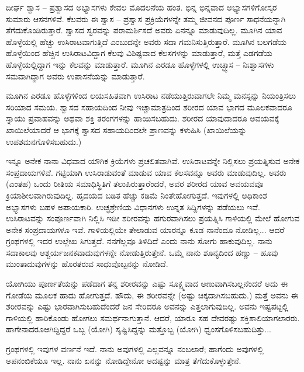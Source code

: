 \vskip 1.5pt

ದೀರ್ಘ ಶ್ವಾಸ – ಪ್ರಶ್ವಾಸದ ಅಭ್ಯಾಸಗಳು ಕೇವಲ ಮೊದಲನೆಯ ಹಂತ. ಭಿನ್ನ ಭಿನ್ನವಾದ ಅಭ್ಯಾಸಗಳಿಗೋಸ್ಕರ ಸುಮಾರು  ಆಸನಗಳಿವೆ. ಕೆಲವರು ಈ ಶ್ವಾಸ – ಪ್ರಶ್ವಾಸ ಪ್ರಕ್ರಿಯೆಗಳನ್ನೇ ತಮ್ಮ ಜೀವನದ ಪೂರ್ಣ ಸಾಧನೆಯನ್ನಾಗಿ ತೆಗೆದುಕೊಂಡಿರುತ್ತಾರೆ. ಶ್ವಾಸದ ಸ್ವರವನ್ನು ಪರಾಮರ್ಶಿಸದೆ ಅವರು ಏನನ್ನೂ ಮಾಡುವುದಿಲ್ಲ. ಮೂಗಿನ ಯಾವ ಹೊಳ್ಳೆಯಲ್ಲಿ ಹೆಚ್ಚು ಉಸಿರಾಟವಾಗುತ್ತಿದೆ ಎಂಬುದನ್ನೇ ಅವರು ಸದಾ ಗಮನಿಸುತ್ತಿರುತ್ತಾರೆ. ಮೂಗಿನ ಬಲಗಡೆಯ ಹೊಳ್ಳೆಯಿಂದ ಹೆಚ್ಚಿನ ಉಸಿರಾಟವಿದ್ದಾಗ ಕೆಲವು ವಿಶಿಷ್ಟವಾದ ಕೆಲಸಗಳನ್ನು ಮಾಡುತ್ತಾರೆ, ಮತ್ತೆ ಎಡಗಡೆಯ ಹೊಳ್ಳೆಯಲ್ಲಿದ್ದಾಗ ಇನ್ನು ಕೆಲವನ್ನು ಮಾಡುತ್ತಾರೆ. ಮೂಗಿನ ಎರಡೂ ಹೊಳ್ಳೆಗಳಲ್ಲಿ ಉಚ್ಛ್ವಾಸ – ನಿಃಶ್ವಾಸಗಳು ಸಮವಾಗಿದ್ದಾಗ ಅವರು ಉಪಾಸನೆಯನ್ನು ಮಾಡುತ್ತಾರೆ.

\vskip 1.5pt

ಮೂಗಿನ ಎರಡೂ ಹೊಳ್ಳೆಗಳಿಂದ ಲಯಸಹಿತವಾಗಿ ಉಸಿರಾಟ ನಡೆಯುತ್ತಿರುವಾಗಲೇ ನಿಮ್ಮ ಮನಸ್ಸನ್ನು ನಿಯಂತ್ರಿಸಲು ಸರಿಯಾದ ಸಮಯ. ಶ್ವಾಸದ ಸಹಾಯದಿಂದ ನೀವು ಇಚ್ಚಾಮಾತ್ರದಿಂದ ಶರೀರದ ಯಾವ ಭಾಗದ ಮೂಲಕವಾದರೂ ಸ್ನಾಯು ಪ್ರವಾಹವನ್ನು ಅಥವಾ ಶಕ್ತಿ ತರಂಗಗಳನ್ನು ಹಾಯಿಸಬಹುದು. ಶರೀರದ ಯಾವುದಾದರೂ ಅವಯವಕ್ಕೆ ಖಾಯಿಲೆಯಾದರೆ ಆ ಭಾಗಕ್ಕೆ ಶ್ವಾಸದ ಸಹಾಯದಿಂದಲೇ ಪ್ರಾಣವನ್ನು ಕಳುಹಿಸಿ (ಖಾಯಿಲೆಯನ್ನು ಉಪಶಮನಗೊಳಿಸಬಹುದು.)

\vskip 1.5pt

ಇನ್ನೂ ಅನೇಕ ನಾನಾ ವಿಧವಾದ ಯೌಗಿಕ ಕ್ರಿಯೆಗಳು ಪ್ರಚಲಿತವಾಗಿವೆ. ಉಸಿರಾಟವನ್ನೇ ನಿಲ್ಲಿಸಲು ಪ್ರಯತ್ನಿಸುವ ಅನೇಕ ಸಂಪ್ರದಾಯಗಳಿವೆ. ಗಟ್ಟಿಯಾಗಿ ಉಸಿರಾಡುವಂತೆ ಮಾಡುವ ಯಾವ ಕೆಲಸವನ್ನೂ ಅವರು ಮಾಡುವುದಿಲ್ಲ. ಅವರು (ಎಂತಹ) ಒಂದು ರೀತಿಯ ಸಮಾಧಿಸ್ಥಿತಿಗೆ ತಲುಪಿರುತ್ತಾರೆಂದರೆ, ಅವರ ಶರೀರದ ಯಾವ ಅವಯವವೂ ಕ್ರಿಯಾಶೀಲವಾಗಿರುವುದಿಲ್ಲ. ಹೃದಯದ ಬಡಿತ ಹೆಚ್ಚು ಕಡಿಮೆ ನಿಂತೇಹೋಗುತ್ತದೆ. ಇವುಗಳಲ್ಲಿ ಅಧಿಕಾಂಶ ಅಭ್ಯಾಸಗಳು ಬಹಳ ಅಪಾಯಕಾರಿ. ಉಚ್ಛಶ್ರೇಣಿಯ ವಿಧಾನಗಳು ಉನ್ನತ ಸಿದ್ದಿಗಳನ್ನು ಪಡೆಯಲು ಇವೆ. ಉಸಿರಾಟವನ್ನು ಸಂಪೂರ್ಣವಾಗಿ ನಿಲ್ಲಿಸಿ ಇಡೀ ಶರೀರವನ್ನು ಹಗುರವಾಗಿಸಲು ಪ್ರಯತ್ನಿಸಿ ಗಾಳಿಯಲ್ಲಿ ಮೇಲೆ ಹೋಗುವ ಅನೇಕ ಸಂಪ್ರದಾಯಗಳೂ ಇವೆ. ಗಾಳಿಯಲ್ಲಿಯೇ ತೇಲಾಡುವ ಯಾರನ್ನೂ ಕೂಡ ನಾನೆಂದೂ ನೋಡಿಲ್ಲ... ಆದರೆ ಗ್ರಂಥಗಳಲ್ಲಿ ಇದರ ಉಲ್ಲೇಖ ಸಿಗುತ್ತದೆ. ನನಗೆಲ್ಲವೂ ತಿಳಿದಿದೆ ಎಂದು ನಾನು ಸೋಗು ಹಾಕುವುದಿಲ್ಲ. ನಾನು ಸದಾಕಾಲವು ಆಶ್ಚರ್ಯಜನಕವಾದುವುಗಳನ್ನೇ ನೋಡುತ್ತಿರುತ್ತೇನೆ. ಒಮ್ಮೆ ನಾನು ಶೂನ್ಯದಿಂದ ಹಣ್ಣು – ಹೂವು ಮುಂತಾದುವುಗಳನ್ನು ಹೊರತರುವ ಸಾಧುವೊಬ್ಬನನ್ನು ನೋಡಿದೆ.

\vskip 1.5pt

ಯೋಗಿಯು ಪೂರ್ಣತೆಯನ್ನು ಪಡೆದಾಗ ತನ್ನ ಶರೀರವನ್ನು ಎಷ್ಟು ಸೂಕ್ಷ್ಮವಾದ ಅಣುವಾಗಿಸಬಲ್ಲನೆಂದರೆ ಅದು ಈ ಗೋಡೆಯ ಮೂಲಕ ಹಾದು ಹೋಗುತ್ತದೆ. ಹೌದು, ಈ ಶರೀರವನ್ನೇ (ಅಷ್ಟು ಚಿಕ್ಕದಾಗಿಸಬಹುದು.) ಮತ್ತೆ ಅವನು ಈ ಶರೀರವನ್ನು ಎಷ್ಟು ಭಾರವಾಗಿಸುಬಹುದೆಂದರೆ  ಜನ ಸೇರಿದರೂ ಅವನನ್ನು ಎತ್ತಲಾಗುವುದಿಲ್ಲ. ಅವನು ಇಷ್ಟಪಟ್ಟಲ್ಲಿ ಗಾಳಿಯಲ್ಲಿ ಹಾರಿಕೊಂಡು ಹೋಗಲು ಸಮರ್ಥನಾಗುತ್ತಾನೆ. ಆದರೆ, ಯಾರೂ ಸಹ ದೇವರಷ್ಟು ಶಕ್ತಿಶಾಲಿಯಾಗಲಾರರು. ಹಾಗೇನಾದರೂ\break ಆಗಿದ್ದಿದ್ದರೆ ಒಬ್ಬ (ಯೋಗಿ) ಸೃಷ್ಟಿಸಿದ್ದನ್ನು ಮತ್ತೊಬ್ಬ (ಯೋಗಿ) ಧ್ವಂಸಗೊಳಿಸಬಹುದಿತ್ತು...

\vskip 1.5pt

ಗ್ರಂಥಗಳಲ್ಲಿ ಇವುಗಳ ವರ್ಣನೆ ಇದೆ. ನಾನು ಅವುಗಳಲ್ಲಿ ಎಲ್ಲವನ್ನೂ ನಂಬಲಾರೆ; ಹಾಗೆಂದು ಅವುಗಳಲ್ಲಿ ಅಪನಂಬಿಕೆಯೂ ಇಲ್ಲ. ನಾನು ಏನನ್ನು ನೋಡಿದ್ದೇನೋ ಅದಷ್ಟನ್ನು ಮಾತ್ರ ತೆಗೆದುಕೊಳ್ಳುತ್ತೇನೆ.

